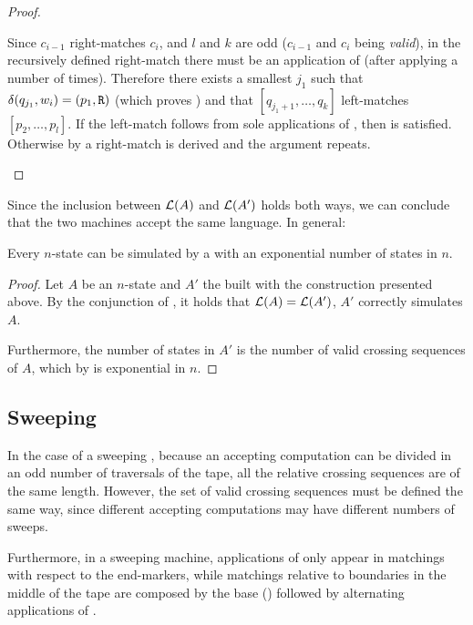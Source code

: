 \begin{proof}
\begin{description}
		      Since $c_{i-1}$ right-matches $c_i$, and $l$ and $k$ are odd ($c_{i-1}$ and $c_i$ being \emph{valid}), in the recursively defined right-match there must be an application of  (after applying  a number of times).
		      Therefore there exists a smallest $j_1$ such that $\delta(q_{j_1},w_i)=(p_1,\mathtt R)$ (which proves ) and that $[q_{j_1+1},\dots,q_k]$ left-matches $[p_2,\dots,p_l]$.
		      If the left-match follows from sole applications of , then  is satisfied.
		      Otherwise by  a right-match is derived and the argument repeats. \qedhere
	\end{description}
\end{proof}

Since the inclusion between $\mathcal L(A)$ and $\mathcal L(A')$ holds both ways, we can conclude that the two machines accept the same language.
In general:
\begin{thrm}\label{thm:2DFAto1NFA}
	Every $n$-state \TDFA can be simulated by a \ONFA with an exponential number of states in $n$.
\end{thrm}
\begin{proof}
	Let $A$ be an $n$-state \TDFA and $A'$ the \ONFA built with the construction presented above.
	By the conjunction of , it holds that $\mathcal L(A)=\mathcal L(A')$, \ie $A'$ correctly simulates $A$.

	Furthermore, the number of states in $A'$ is the number of valid crossing sequences of $A$, which by  is exponential in $n$.
\end{proof}



\subsection{Sweeping \TDFAs}
In the case of a sweeping \TDFA, because an accepting computation can be divided in an odd number of traversals of the tape, all the relative crossing sequences are of the same length.
However, the set of valid crossing sequences must be defined the same way, since different accepting computations may have different numbers of sweeps.

Furthermore, in a sweeping machine, applications of  only appear in matchings with respect to the end-markers, while matchings relative to boundaries in the middle of the tape are composed by the base () followed by alternating applications of .




